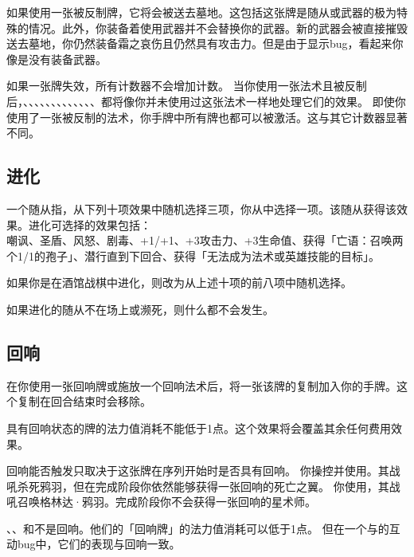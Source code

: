 如果使用一张被反制牌，它将会被送去墓地。这包括这张牌是随从或武器的极为特殊的情况。此外，你装备着使用武器并不会替换你的武器。新的武器会被直接摧毁送去墓地，你仍然装备霜之哀伤且仍然具有攻击力。但是由于显示bug，看起来你像是没有装备武器。

如果一张牌失效，所有计数器不会增加计数。
\example 当你使用一张法术且被反制后，、、、、、、、、、、、、、都将像你并未使用过这张法术一样地处理它们的效果。
\exception 即使你使用了一张被反制的法术，你手牌中所有牌也都可以被激活。这与其它计数器显著不同。

\subsection{进化}
\label{adapt}

一个随从指，从下列十项效果中随机选择三项，你从中选择一项。该随从获得该效果。进化可选择的效果包括：\\
嘲讽、圣盾、风怒、剧毒、+1/+1、+3攻击力、+3生命值、获得「亡语：召唤两个1/1的孢子」、潜行直到下回合、获得「无法成为法术或英雄技能的目标」。

如果你是在酒馆战棋中进化，则改为从上述十项的前八项中随机选择。

如果进化的随从不在场上或濒死，则什么都不会发生。

\subsection{回响}
\label{echo}

在你使用一张回响牌或施放一个回响法术后，将一张该牌的复制加入你的手牌。这个复制在回合结束时会移除。

具有回响状态的牌的法力值消耗不能低于1点。这个效果将会覆盖其余任何费用效果。

回响能否触发只取决于这张牌在序列开始时是否具有回响。
\example 你操控并使用。其战吼杀死鸦羽，但在完成阶段你依然能够获得一张回响的死亡之翼。
\example 你使用，其战吼召唤格林达·鸦羽。完成阶段你不会获得一张回响的星术师。

、、和不是回响。他们的「回响牌」的法力值消耗可以低于1点。
\notice 但在一个与的互动bug中，它们的表现与回响一致。

